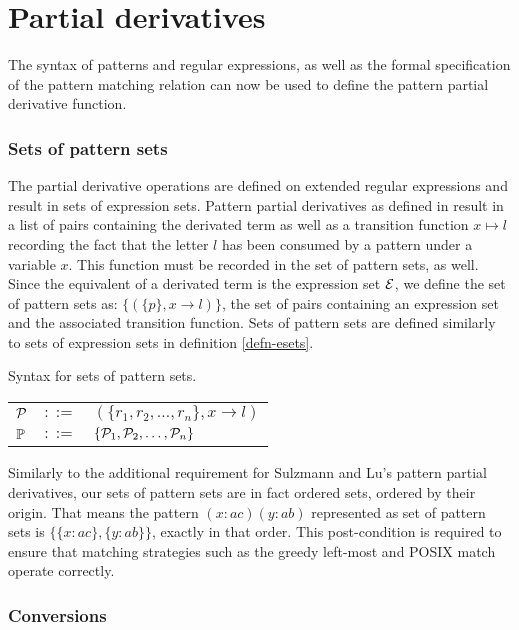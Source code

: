 \section{Partial derivatives}
\label{exprsets}

The syntax of patterns and regular expressions, as well as the formal
specification of the pattern matching relation can now be used to define the
pattern partial derivative function.

\subsubsection{Sets of pattern sets}

The partial derivative operations are defined on extended regular expressions
and result in sets of expression sets. Pattern partial derivatives as defined in
\cite{pdpat} result in a list of pairs containing the derivated term as well as
a transition function $x \mapsto l$ recording the fact that the letter $l$ has
been consumed by a pattern under a variable $x$. This function must be recorded
in the set of pattern sets, as well. Since the equivalent of a derivated term is
the expression set $\mathcal{E}$, we define the set of pattern sets as: $\{ (\{ p \},
x \to l) \}$, the set of pairs containing an expression set and the associated
transition function. Sets of pattern sets are defined similarly to sets of
expression sets in definition \ref{defn-esets}.

\begin{defn}
   \label{defn-psets}
   Syntax for sets of pattern sets.

   \begin{tabular}{lll}
      $\mathcal{P}$	& $::=$ & $(\{r_1, r_2, \dots, r_n\}, x \to l)$ \\
      $\mathbb{P}$	& $::=$ & $\{\mathcal{P}_1, \mathcal{P}_2, \dots, \mathcal{P}_n\}$ \\
   \end{tabular}
\end{defn}

Similarly to the additional requirement for Sulzmann and Lu's pattern partial
derivatives, our sets of pattern sets are in fact ordered sets, ordered by their
origin. That means the pattern $(x:ac)(y:ab)$ represented as set of pattern sets
is $\{\{x:ac\}, \{y:ab\}\}$, exactly in that order. This post-condition is
required to ensure that matching strategies such as the greedy left-most and
POSIX match operate correctly.


\subsubsection{Conversions}

